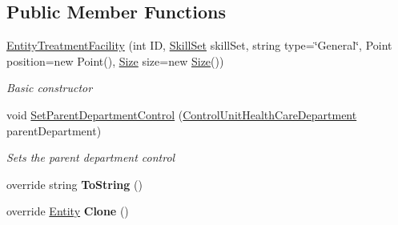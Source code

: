 \subsection*{Public Member Functions}
\begin{DoxyCompactItemize}
\item 
\hyperlink{class_general_health_care_elements_1_1_entities_1_1_entity_treatment_facility_a6af266d08612f74f727674a750637be3}{Entity\+Treatment\+Facility} (int ID, \hyperlink{class_simulation_core_1_1_h_c_c_m_elements_1_1_skill_set}{Skill\+Set} skill\+Set, string type=\char`\"{}General\char`\"{}, Point position=new Point(), \hyperlink{class_general_health_care_elements_1_1_entities_1_1_entity_treatment_facility_a6f9e7fc7343f99d15f9bd18667dff61f}{Size} size=new \hyperlink{class_general_health_care_elements_1_1_entities_1_1_entity_treatment_facility_a6f9e7fc7343f99d15f9bd18667dff61f}{Size}())
\begin{DoxyCompactList}\small\item\em Basic constructor \end{DoxyCompactList}\item 
void \hyperlink{class_general_health_care_elements_1_1_entities_1_1_entity_treatment_facility_ab07d75de17df11a6af52ef4928758337}{Set\+Parent\+Department\+Control} (\hyperlink{class_general_health_care_elements_1_1_control_units_1_1_control_unit_health_care_department}{Control\+Unit\+Health\+Care\+Department} parent\+Department)
\begin{DoxyCompactList}\small\item\em Sets the parent department control \end{DoxyCompactList}\item 
override string {\bfseries To\+String} ()\hypertarget{class_general_health_care_elements_1_1_entities_1_1_entity_treatment_facility_aa1a3859e1ed689c0da2c9b3e1eb65e8a}{}\label{class_general_health_care_elements_1_1_entities_1_1_entity_treatment_facility_aa1a3859e1ed689c0da2c9b3e1eb65e8a}

\item 
override \hyperlink{class_simulation_core_1_1_h_c_c_m_elements_1_1_entity}{Entity} {\bfseries Clone} ()\hypertarget{class_general_health_care_elements_1_1_entities_1_1_entity_treatment_facility_a62b3e5bc80881759505cb3fe0dd3a2eb}{}\label{class_general_health_care_elements_1_1_entities_1_1_entity_treatment_facility_a62b3e5bc80881759505cb3fe0dd3a2eb}

\end{DoxyCompactItemize}
